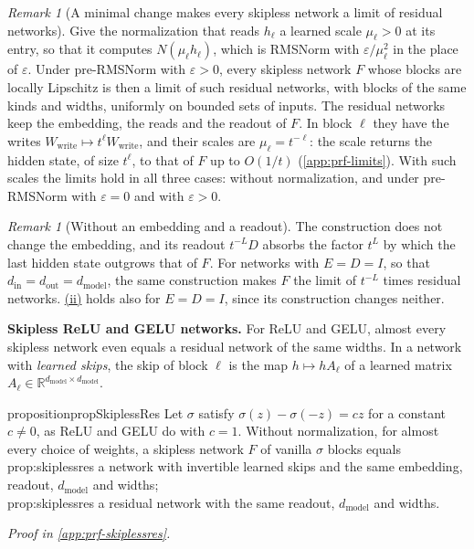 \documentclass[10pt]{article}
\theoremstyle{definition}
\theoremstyle{remark}
\newtheorem{remark}[theorem]{Remark}
\newcommand{\R}{\mathbb{R}}
\newcommand{\Wwrite}{W_{\mathrm{write}}}
\newcommand{\dm}{d_{\mathrm{model}}}
\newcommand{\para}[1]{\smallskip\noindent\textbf{#1}\hspace{0.5em}}
\newcommand{\ptlabel}[1]{\phantomsection\label{#1}}
\DeclareRobustCommand{\Cpref}[2]{\hyperref[#1:#2]{\Cref*{#1}(#2)}}
\newcommand{\proofin}[1]{\par\vspace{-0.4\baselineskip}\noindent\hfill{\small\itshape Proof in \cref{#1}.}\par\smallskip}
\newcommand{\stpart}[3]{\ifx\relax#1\relax\else\ptlabel{#1:#2}\fi{\upshape\bfseries\boldmath(#2)\ifx\relax#3\relax\else\ #3.\fi}}
\begin{document}
\begin{remark}[A minimal change makes every skipless network a limit of residual networks]\label{rem:scale}
Give the normalization that reads $h_\ell$ a learned scale $\mu_\ell > 0$ at its entry, so that it computes $N(\mu_\ell h_\ell)$, which is RMSNorm with $\varepsilon/\mu_\ell^2$ in the place of $\varepsilon$. Under pre-RMSNorm with $\varepsilon > 0$, every skipless network $F$ whose blocks are locally Lipschitz is then a limit of such residual networks, with blocks of the same kinds and widths, uniformly on bounded sets of inputs. The residual networks keep the embedding, the reads and the readout of $F$. In block $\ell$ they have the writes $\Wwrite \mapsto t^\ell\Wwrite$, and their scales are $\mu_\ell = t^{-\ell}$: the scale returns the hidden state, of size $t^\ell$, to that of $F$ up to $O(1/t)$ (\cref{app:prf-limits}). With such scales the limits hold in all three cases: without normalization, and under pre-RMSNorm with $\varepsilon = 0$ and with $\varepsilon > 0$.
\end{remark}

\begin{remark}[Without an embedding and a readout]\label{rem:noreadout}
The construction does not change the embedding, and its readout $t^{-L}D$ absorbs the factor $t^{L}$ by which the last hidden state outgrows that of $F$. For networks with $E = D = I$, so that $d_{\mathrm{in}} = d_{\mathrm{out}} = \dm$, the same construction makes $F$ the limit of $t^{-L}$ times residual networks. \Cpref{prop:limits}{ii} holds also for $E = D = I$, since its construction changes neither.
\end{remark}

\para{Skipless ReLU and GELU networks.} For ReLU and GELU, almost every skipless network even equals a residual network of the same widths. In a network with \emph{learned skips}, the skip of block $\ell$ is the map $h \mapsto hA_\ell$ of a learned matrix $A_\ell \in \R^{\dm\times\dm}$.

\begin{restatable}{proposition}{propSkiplessRes}\label{prop:skiplessres}
Let $\sigma$ satisfy $\sigma(z) - \sigma(-z) = cz$ for a constant $c \neq 0$, as ReLU and GELU do with $c = 1$. Without normalization, for almost every choice of weights, a skipless network $F$ of vanilla $\sigma$ blocks equals\\
\stpart{prop:skiplessres}{i}{} a network with invertible learned skips and the same embedding, readout, $\dm$ and widths;\\
\stpart{prop:skiplessres}{ii}{} a residual network with the same readout, $\dm$ and widths.
\end{restatable}
\proofin{app:prf-skiplessres}
\end{document}
